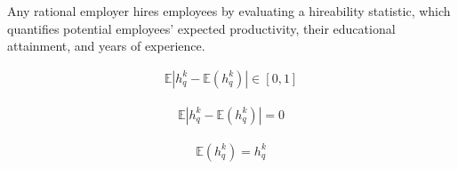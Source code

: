\documentclass[hidelinks, nonatbib]{elsarticle}
\begin{document}
\begin{axiom}
    \label{ha}
    Any rational employer hires employees by evaluating a hireability statistic, which quantifies potential employees' expected productivity, their educational attainment, and years of experience.

    \begin{subaxiom}
        \begin{gather}
            \mathbb{E}
                \left| 
                    h_{q}^{k} - 
                    \mathbb{E}(h_{q}^{k})
                \right| 
            \in [0,1]
        \end{gather}
    \end{subaxiom}
    
    \begin{subaxiom}
        \begin{gather}
            \mathbb{E}
                \left| 
                    h_{q}^{k} - 
                    \mathbb{E}(h_{q}^{k})
                \right| 
            = 0
        \end{gather}
    \end{subaxiom}
    
    \begin{subaxiom}
        \begin{gather}
            \mathbb{E}(h_{q}^{k}) = h_{q}^{k}
        \end{gather}
    \end{subaxiom}
\end{axiom}
\end{document}

